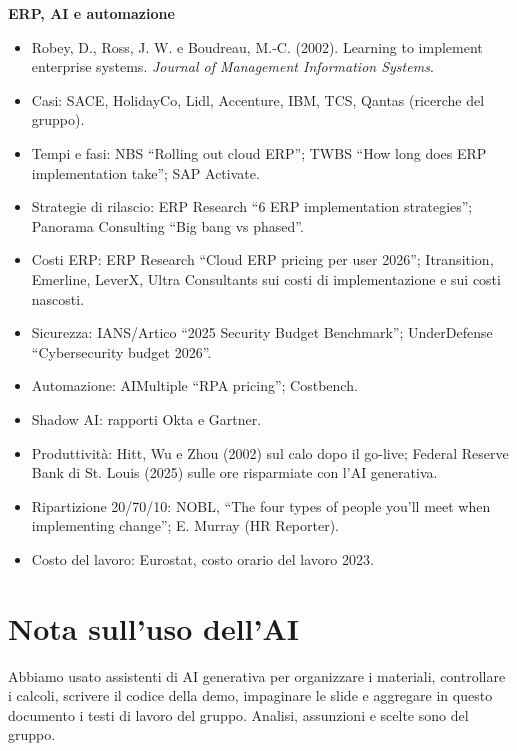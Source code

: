 \documentclass[11pt,a4paper]{article}
\begin{document}
\textbf{ERP, AI e automazione}
\begin{itemize}
\item Robey, D., Ross, J. W. e Boudreau, M.-C. (2002). Learning to implement enterprise systems. \emph{Journal of Management Information Systems}.
\item Casi: SACE, HolidayCo, Lidl, Accenture, IBM, TCS, Qantas (ricerche del gruppo).
\item Tempi e fasi: NBS ``Rolling out cloud ERP''; TWBS ``How long does ERP implementation take''; SAP Activate.
\item Strategie di rilascio: ERP Research ``6 ERP implementation strategies''; Panorama Consulting ``Big bang vs phased''.
\item Costi ERP: ERP Research ``Cloud ERP pricing per user 2026''; Itransition, Emerline, LeverX, Ultra Consultants sui costi di implementazione e sui costi nascosti.
\item Sicurezza: IANS/Artico ``2025 Security Budget Benchmark''; UnderDefense ``Cybersecurity budget 2026''.
\item Automazione: AIMultiple ``RPA pricing''; Costbench.
\item Shadow AI: rapporti Okta e Gartner.
\item Produttività: Hitt, Wu e Zhou (2002) sul calo dopo il go-live; Federal Reserve Bank di St. Louis (2025) sulle ore risparmiate con l'AI generativa.
\item Ripartizione 20/70/10: NOBL, ``The four types of people you'll meet when implementing change''; E. Murray (HR Reporter).
\item Costo del lavoro: Eurostat, costo orario del lavoro 2023.
\end{itemize}

\section{Nota sull'uso dell'AI}\label{sec:24}

Abbiamo usato assistenti di AI generativa per organizzare i materiali, controllare i calcoli, scrivere il codice della demo, impaginare le slide e aggregare in questo documento i testi di lavoro del gruppo. Analisi, assunzioni e scelte sono del gruppo.
\end{document}
